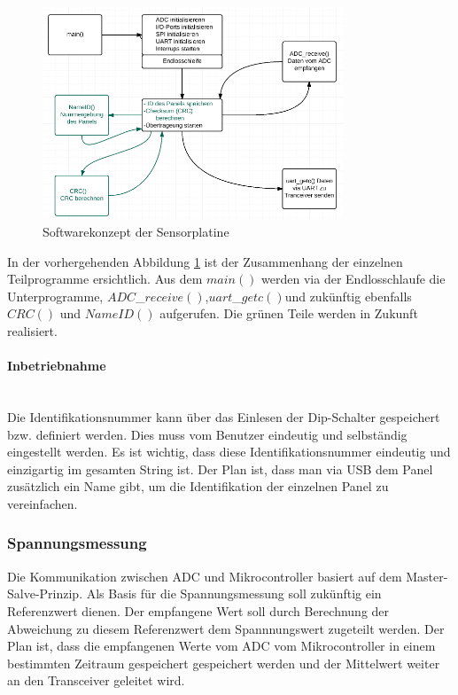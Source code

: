 \begin{figure}[htb]
\centering
\includegraphics[width=0.8\textwidth]{sections/data/Sensorplatine}
\caption{Softwarekonzept der Sensorplatine}
\label{DiagrammSP}
\end{figure}

In der vorhergehenden Abbildung \ref{DiagrammSP} ist der Zusammenhang der einzelnen Teilprogramme ersichtlich. Aus dem $main()$ werden via der Endlosschlaufe die Unterprogramme, $ADC$\_$receive()$,$uart$\_$getc()$und zukünftig ebenfalls $CRC()$ und $NameID()$ aufgerufen. Die grünen Teile werden in Zukunft realisiert.\\

\paragraph{Inbetriebnahme}\\
Die Identifikationsnummer kann über das Einlesen der Dip-Schalter gespeichert bzw. definiert werden. Dies muss vom Benutzer eindeutig und selbständig eingestellt werden. Es ist wichtig, dass diese Identifikationsnummer eindeutig und einzigartig im gesamten String ist. Der Plan ist, dass man via USB dem Panel zusätzlich ein Name gibt, um die Identifikation der einzelnen Panel zu vereinfachen. 

\subsubsection{Spannungsmessung}
Die Kommunikation zwischen ADC und Mikrocontroller basiert auf dem Master-Salve-Prinzip. 
Als Basis für die Spannungsmessung soll zukünftig ein Referenzwert dienen. Der empfangene Wert soll durch Berechnung der Abweichung zu diesem Referenzwert dem Spannnungswert zugeteilt werden. Der Plan ist, dass die empfangenen Werte vom ADC vom Mikrocontroller in einem bestimmten Zeitraum gespeichert gespeichert werden und der Mittelwert weiter an den Transceiver geleitet wird.

